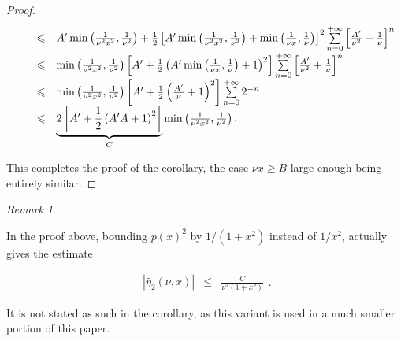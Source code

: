 \documentclass{jams-l}
\theoremstyle{definition}
\theoremstyle{remark}
\newtheorem{remark}[theorem]{Remark}
\numberwithin{equation}{section}
\begin{document}
\begin{proof}
\[\begin{array}{lllll}
                    \quad & \leqslant & \multicolumn{3}{l}{A' \min \left( \frac{1}{\nu^2 x^2}, \frac{1}{\nu^2} \right) + \frac{1}{2} \left[ A' \min \left( \frac{1}{\nu^2 x^2}, \frac{1}{\nu^2} \right) + \min \left( \frac{1}{\nu x}, \frac{1}{\nu} \right) \right]^2 \sum\limits_{n=0}^{+ \infty} \left[ \frac{A'}{\nu^2} + \frac{1}{\nu} \right]^n} \\[0.5em]
                    
                    & \leqslant & \multicolumn{3}{l}{\min \left( \frac{1}{\nu^2 x^2}, \frac{1}{\nu^2} \right) \left[ A' + \frac{1}{2} \left( A' \min \left( \frac{1}{\nu x}, \frac{1}{\nu} \right) + 1 \right)^2 \right] \sum\limits_{n=0}^{+ \infty} \left[ \frac{A'}{\nu^2} + \frac{1}{\nu} \right]^n} \\[0.5em]
                    
                    & \leqslant & \multicolumn{3}{l}{\min \left( \frac{1}{\nu^2 x^2}, \frac{1}{\nu^2} \right) \left[ A' + \frac{1}{2} \left( \frac{A'}{\nu} + 1 \right)^2 \right] \sum\limits_{n=0}^{+ \infty} 2^{-n}} \\[0.5em]
                    
                    & \leqslant & \multicolumn{3}{l}{\underbrace{2 \left[ A' + \frac{1}{2} \left( A'A + 1 \right)^2 \right]}_{C} \min \left( \frac{1}{\nu^2 x^2}, \frac{1}{\nu^2} \right).}
                \end{array} \]
            
            \noindent This completes the proof of the corollary, the case $\nu x \geqslant B$ large enough being entirely similar.
        
        \end{proof}
        
        \begin{remark}
        \label{RmkEstimateEta2Tilde}
        
            In the proof above, bounding $p \left( x \right)^2$ by $1/\left( 1 + x^2 \right)$ instead of $1/x^2$, actually gives the estimate
            
            \[ \begin{array}{lll}
                    \left \vert \widetilde{\eta_2} \left( \nu, x \right) \right \vert & \leqslant & \frac{C}{\nu^2 \left( 1 + x^2 \right)}
                \end{array} . \]
            
            \noindent It is not stated as such in the corollary, as this variant is used in a much smaller portion of this paper.
        
        \end{remark}
        
\end{document}
